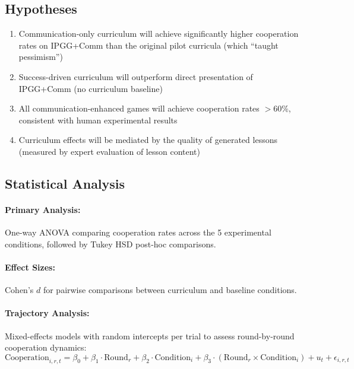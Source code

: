\subsection{Hypotheses}

\begin{enumerate}
    \item[\textbf{H1}:] Communication-only curriculum will achieve significantly higher cooperation rates on IPGG+Comm than the original pilot curricula (which ``taught pessimism'')

    \item[\textbf{H2}:] Success-driven curriculum will outperform direct presentation of IPGG+Comm (no curriculum baseline)

    \item[\textbf{H3}:] All communication-enhanced games will achieve cooperation rates $> 60\%$, consistent with human experimental results

    \item[\textbf{H4}:] Curriculum effects will be mediated by the quality of generated lessons (measured by expert evaluation of lesson content)
\end{enumerate}


\subsection{Statistical Analysis}

\paragraph{Primary Analysis:}
One-way ANOVA comparing cooperation rates across the 5 experimental conditions, followed by Tukey HSD post-hoc comparisons.

\paragraph{Effect Sizes:}
Cohen's $d$ for pairwise comparisons between curriculum and baseline conditions.

\paragraph{Trajectory Analysis:}
Mixed-effects models with random intercepts per trial to assess round-by-round cooperation dynamics:
\[
\text{Cooperation}_{i,r,t} = \beta_0 + \beta_1 \cdot \text{Round}_r + \beta_2 \cdot \text{Condition}_i + \beta_3 \cdot (\text{Round}_r \times \text{Condition}_i) + u_t + \epsilon_{i,r,t}
\]

